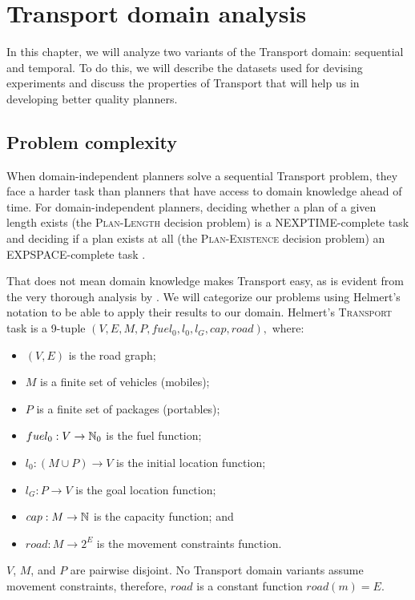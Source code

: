 \chapter{Transport domain analysis}

In this chapter, we will analyze two variants of the Transport domain: sequential and temporal. To do this, we will describe the datasets
used for devising experiments and discuss the properties of Transport
that will help us in developing better quality planners.

\section{Problem complexity}

When domain-independent planners solve a sequential Transport problem,
they face a harder task than planners that have access to domain knowledge ahead of time.
For domain-independent planners, deciding whether a plan of a given length exists
(the \textsc{Plan-Length} decision problem) is
a NEXPTIME-complete task
and deciding if a plan exists at all (the \textsc{Plan-Existence} decision problem)
an EXPSPACE-complete task \citep[Table~3.2]{Ghallab2004}.

That does not mean domain knowledge makes Transport easy, as is evident from
the very thorough analysis by \citet{Helmert2001, Helmert2001a}.
We will categorize our problems using Helmert's notation to
be able to apply their results to our domain.
Helmert's \textsc{Transport} task is a 9-tuple $(V, E, M, P, fuel_0, l_0, l_G, cap, road),$
where:
\begin{itemize}
\item $(V, E)$ is the road graph;
\item $M$ is a finite set of vehicles (mobiles);
\item $P$ is a finite set of packages (portables);
\item $fuel_0 : V \to \mathbb{N}_0$ is the fuel function;
\item $l_0: (M \cup P) \to V$ is the initial location function;
\item $l_G: P \to V$ is the goal location function;
\item $cap: M \to \mathbb{N}$ is the capacity function; and
\item $road: M \to 2^E$ is the movement constraints function.
\end{itemize}
$V$, $M$, and $P$ are pairwise disjoint.
No Transport domain variants assume movement constraints, therefore, $road$ is a constant
function $road(m) = E$.

